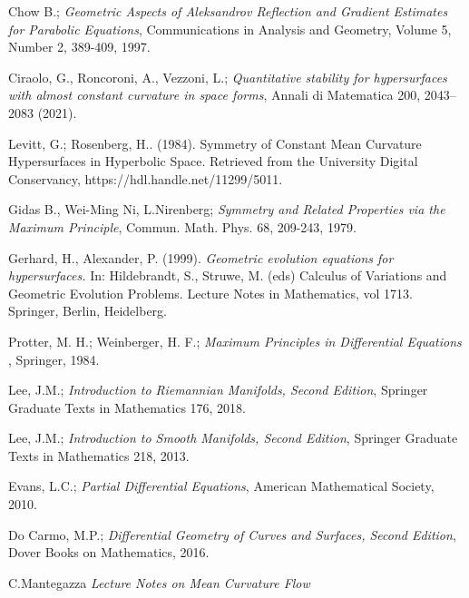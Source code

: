 \documentclass[a4paper, 12pt]{book}
\begin{document}
\clearpage
\begin{thebibliography}{11} 
	 Chow B.; {\em Geometric Aspects of Aleksandrov Reflection and Gradient Estimates for Parabolic Equations}, Communications in Analysis and Geometry, Volume 5, Number 2, 389-409, 1997.
	
	 Ciraolo, G., Roncoroni, A., Vezzoni, L.;  {\em Quantitative stability for hypersurfaces with almost constant curvature in space forms}, Annali di Matematica 200, 2043–2083 (2021).
	
	Levitt, G.; Rosenberg, H.. (1984). Symmetry of Constant Mean Curvature Hypersurfaces in Hyperbolic Space. Retrieved from the University Digital Conservancy, https://hdl.handle.net/11299/5011.
	
	 Gidas B., Wei-Ming Ni, L.Nirenberg; {\em Symmetry and Related Properties via the Maximum Principle},  Commun. Math. Phys. 68, 209-243, 1979. 
	
	 Gerhard, H., Alexander, P. (1999). {\em Geometric evolution equations for hypersurfaces.} In: Hildebrandt, S., Struwe, M. (eds) Calculus of Variations and Geometric Evolution Problems. Lecture Notes in Mathematics, vol 1713. Springer, Berlin, Heidelberg.
	
	  Protter, M. H.;  Weinberger, H. F.; {\em Maximum Principles in Differential Equations },  Springer, 1984. 
	
	
	 Lee, J.M.; {\em Introduction to Riemannian Manifolds, Second Edition},  Springer Graduate Texts in Mathematics 176, 2018. 
	
	 Lee, J.M.; {\em Introduction to Smooth Manifolds, Second Edition},  Springer Graduate Texts in Mathematics 218, 2013. 
	
	 Evans, L.C.; {\em Partial Differential Equations},  American Mathematical Society, 2010. 
	
	 Do Carmo, M.P.; {\em Differential Geometry of Curves and Surfaces, Second Edition},  Dover Books on Mathematics, 2016. 
	
	
	 C.Mantegazza {\em Lecture Notes on Mean Curvature Flow}
	
\end{thebibliography}
%
\end{document}

